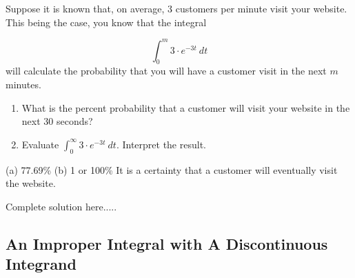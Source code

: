 \begin{example}
Suppose it is known that, on average, 3 customers per minute visit your website. This being the case, you know that the integral

$$\int_{0}^{m} 3\cdot e^{-3t} \ dt$$
will calculate the probability that you will have a customer visit in the next $m$ minutes.\\
\renewcommand{\labelenumi}{(\alph{enumi})}
\begin{enumerate}[leftmargin=*]
    \item What is the percent probability that a customer will visit your website in the next 30 seconds?
    
    \item Evaluate $\displaystyle\int_0^\infty 3\cdot e^{-3t} \ dt$. Interpret the result.
 \end{enumerate}   
        \begin{sol}
        (a) 77.69\% (b) 1 or 100\% It is a certainty that a customer will eventually visit the website.
        \end{sol}
        \begin{solL}
        Complete solution here.....
    
         \end{solL}
\end{example}

\newpage
\subsection*{An Improper Integral with A Discontinuous Integrand}

